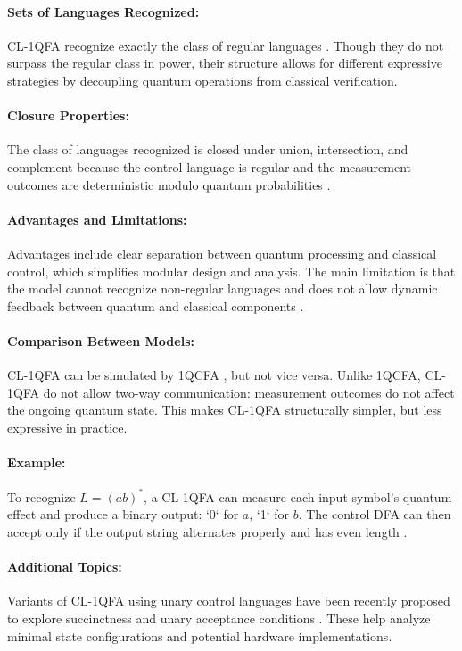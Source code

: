 \paragraph{Sets of Languages Recognized:}  
CL-1QFA recognize exactly the class of regular languages \cite{li2015hybrid}. Though they do not surpass the regular class in power, their structure allows for different expressive strategies by decoupling quantum operations from classical verification.

\paragraph{Closure Properties:}  
The class of languages recognized is closed under union, intersection, and complement because the control language is regular and the measurement outcomes are deterministic modulo quantum probabilities \cite{li2015hybrid}.

\paragraph{Advantages and Limitations:}  
Advantages include clear separation between quantum processing and classical control, which simplifies modular design and analysis. The main limitation is that the model cannot recognize non-regular languages and does not allow dynamic feedback between quantum and classical components \cite{li2015hybrid}.

\paragraph{Comparison Between Models:}  
CL-1QFA can be simulated by 1QCFA \cite{li2015hybrid}, but not vice versa. Unlike 1QCFA, CL-1QFA do not allow two-way communication: measurement outcomes do not affect the ongoing quantum state. This makes CL-1QFA structurally simpler, but less expressive in practice.

\paragraph{Example:}  
To recognize $L = (ab)^*$, a CL-1QFA can measure each input symbol’s quantum effect and produce a binary output: `0` for $a$, `1` for $b$. The control DFA can then accept only if the output string alternates properly and has even length \cite{mereghetti2006quantum}.

\paragraph{Additional Topics:}  
Variants of CL-1QFA using unary control languages have been recently proposed to explore succinctness and unary acceptance conditions \cite{mereghetti2024unary}. These help analyze minimal state configurations and potential hardware implementations.


